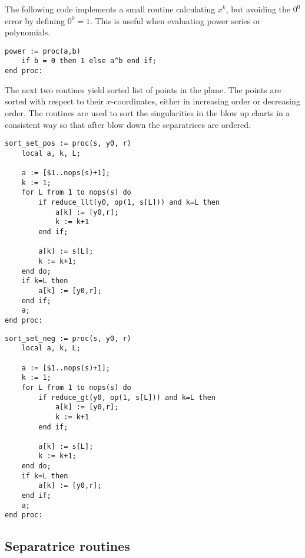 \documentclass[a4paper,10pt]{article}
\begin{document}
The following code implements a small routine calculating $x^k$, but avoiding the $0^0$ error by defining
$0^0 = 1$.  This is useful when evaluating power series or polynomials.

\begin{lstlisting}[name=blowup]
power := proc(a,b)
    if b = 0 then 1 else a^b end if;
end proc:
\end{lstlisting}

The next two routines yield sorted list of points in the plane.  The points are sorted with respect to their
$x$-coordinates, either in increasing order or decreasing order.  The routines are used to sort the singularities
in the blow up charts in a consistent way so that after blow down the separatrices are ordered.

\begin{lstlisting}[name=blowup]
sort_set_pos := proc(s, y0, r)
    local a, k, L;

    a := [$1..nops(s)+1];
    k := 1;
    for L from 1 to nops(s) do
        if reduce_llt(y0, op(1, s[L])) and k=L then
            a[k] := [y0,r];
            k := k+1
        end if;

        a[k] := s[L];
        k := k+1;
    end do;
    if k=L then
        a[k] := [y0,r];
    end if;
    a;
end proc:
\end{lstlisting}

\begin{lstlisting}[name=blowup]
sort_set_neg := proc(s, y0, r)
    local a, k, L;

    a := [$1..nops(s)+1];
    k := 1;
    for L from 1 to nops(s) do
        if reduce_gt(y0, op(1, s[L])) and k=L then
            a[k] := [y0,r];
            k := k+1
        end if;

        a[k] := s[L];
        k := k+1;
    end do;
    if k=L then
        a[k] := [y0,r];
    end if;
    a;
end proc:
\end{lstlisting}

\subsection{Separatrice routines}
\end{document}
